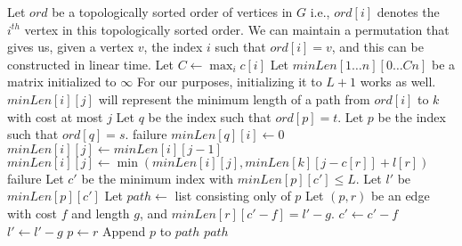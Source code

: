 \documentclass[a4paper]{article}
\begin{document}
\begin{algorithmic}[1]
        \State Let $ord$ be a topologically sorted order of vertices in $G$
        \State \Comment i.e., $ord[i]$ denotes the $i^{th}$ vertex in this topologically sorted order. We can maintain a permutation that gives us, given a vertex $v$, the index $i$ such that
        $ord[i] = v$, and this can be constructed in linear time.
        \State Let $C \gets \max_i c[i]$
        \State Let $minLen[1 \ldots n][0 \ldots Cn]$ be a matrix initialized to $\infty$
        \State \Comment For our purposes, initializing it to $L + 1$ works as well.
        \State \Comment $minLen[i][j]$ will represent the minimum length of a path from $ord[i]$ to $k$ with cost at most $j$
        \State Let $q$ be the index such that $ord[p] = t$.
        \State Let $p$ be the index such that $ord[q] = s$.
            \State \Return failure
        \EndIf
            \State $minLen[q][i] \gets 0$
        \EndFor
                    \State $minLen[i][j] \gets minLen[i][j - 1]$
                \EndIf
                    \State $minLen[i][j] \gets \min(minLen[i][j], minLen[k][j - c[r]] + l[r])$
                \EndFor
            \EndFor
        \EndFor
            \State \Return failure
        \EndIf
        \State Let $c'$ be the minimum index with $minLen[p][c'] \le L$.
        \State Let $l'$ be $minLen[p][c']$
        \State Let $path \gets$ list consisting only of $p$
            \State Let $(p, r)$ be an edge with cost $f$ and length $g$, and $minLen[r][c' - f] = l' - g$.
            \State $c' \gets c' - f$
            \State $l' \gets l' - g$
            \State $p \gets r$
            \State Append $p$ to $path$
        \EndWhile
        \State \Return $path$
    \EndFunction
\end{algorithmic}
\end{document}
